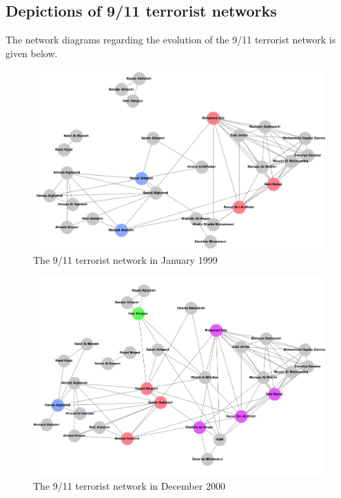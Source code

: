 \begin{subappendices}

\section{Depictions of 9/11 terrorist networks}

The network diagrams regarding the evolution of the 9/11 terrorist network is given below.

\begin{figure}[h]
\label{Terrorist-Jan99}
\begin{center}
\includegraphics[scale=0.4]{imgs/T1999-01.png}
\end{center}
\caption{The 9/11 terrorist network in January 1999}
\end{figure}

\begin{figure}[h]
\label{Terrorist-Dec00}
\begin{center}
\includegraphics[scale=0.4]{imgs/T2000-12.png}
\end{center}
\caption{The 9/11 terrorist network in December 2000}
\end{figure}


\end{subappendices}
